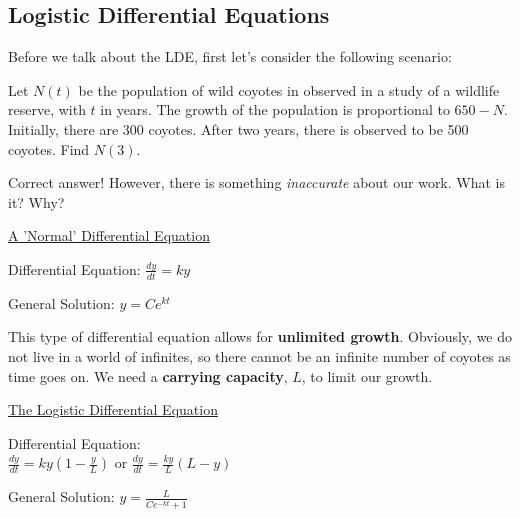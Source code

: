 \subsection*{Logistic Differential Equations}

Before we talk about the LDE, first let's consider the following scenario:
\begin{questions}
    \question Let $N(t)$ be the population of wild coyotes in observed in a study of a wildlife reserve, with $t$ in years. The growth of the population is proportional to $650-N$. Initially, there are 300 coyotes. After two years, there is observed to be 500 coyotes. Find $N(3)$.
    
\end{questions}

Correct answer! However, there is something \textit{inaccurate} about our work. What is it? Why?



\begin{center}
    \underline{A 'Normal' Differential Equation}
\end{center}
\begin{minipage}{0.45\linewidth}
    
        Differential Equation: $\displaystyle\frac{dy}{dt}=ky$
    
\end{minipage}
\hfill
\begin{minipage}{0.45\linewidth}
    
        General Solution: $\displaystyle y=Ce^{kt}$
    
\end{minipage}

This type of differential equation allows for \textbf{unlimited growth}. Obviously, we do not live in a world of infinites, so there cannot be an infinite number of coyotes as time goes on. We need a \textbf{carrying capacity}, $L$, to limit our growth. 


\begin{center}
    \underline{The Logistic Differential Equation}
\end{center}
\begin{minipage}{0.45\linewidth}
    
        Differential Equation:\\ 
        $\displaystyle\frac{dy}{dt}=ky\left(1-\frac{y}{L}\right)$ or $\displaystyle\frac{dy}{dt}=\frac{ky}{L}(L-y)$

\end{minipage}
\hfill
\begin{minipage}{0.45\linewidth}
    
        General Solution: $\displaystyle y=\frac{L}{Ce^{-kt}+1}$
    
\end{minipage}

